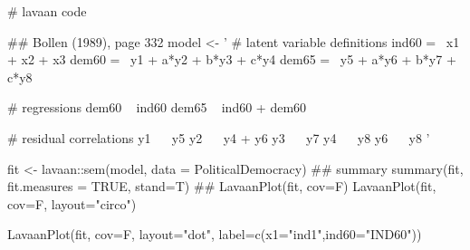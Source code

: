 \documentclass[a4paper]{book}
\begin{document}
\begin{Examples}
\begin{ExampleCode}
# lavaan code

## Bollen (1989), page 332
model <- '
  # latent variable definitions
     ind60 =~ x1 + x2 + x3
     dem60 =~ y1 + a*y2 + b*y3 + c*y4
     dem65 =~ y5 + a*y6 + b*y7 + c*y8

  # regressions
    dem60 ~ ind60
  dem65 ~ ind60 + dem60

  # residual correlations
    y1 ~~ y5
    y2 ~~ y4 + y6
    y3 ~~ y7
    y4 ~~ y8
    y6 ~~ y8
'

fit <- lavaan::sem(model, data = PoliticalDemocracy)
 ## summary
summary(fit, fit.measures = TRUE, stand=T)
##
LavaanPlot(fit, cov=F)
LavaanPlot(fit, cov=F, layout="circo")

LavaanPlot(fit, cov=F, layout="dot",
           label=c(x1="ind1",ind60="IND60"))


\end{ExampleCode}
\end{Examples}
\end{document}
